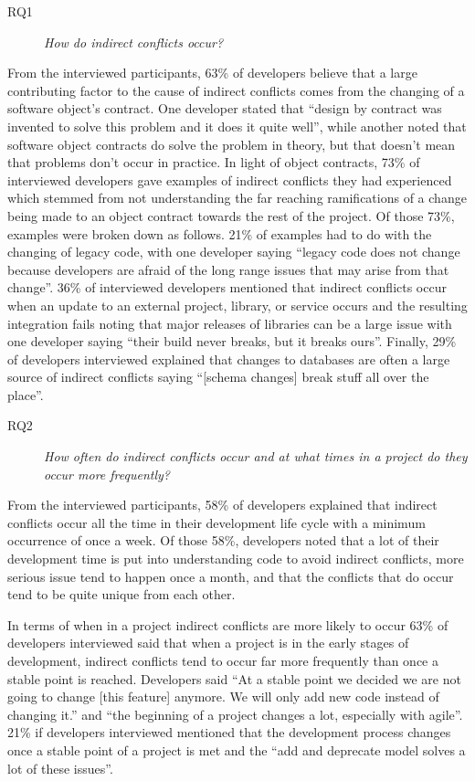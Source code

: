 \documentclass[conference]{IEEEtran}
\begin{document}
\begin{description}
	\item[RQ1] \textit{How do indirect conflicts occur?}
\end{description}

From the interviewed participants, 63\% of developers believe that a large contributing factor to the cause
of indirect conflicts comes from the changing of a software object's contract. One developer stated that ``design
by contract was invented to solve this problem and it does it quite well'', while another noted that software 
object contracts do solve the problem in theory, but that doesn't mean that problems don't occur in practice.
In light of object contracts, 73\% of interviewed developers gave examples of indirect conflicts they had experienced
which stemmed from not understanding the far reaching ramifications of a change being made to an object contract
towards the rest of the project. Of those 73\%, examples were broken down as follows. 21\% of examples had to do 
with the changing of legacy code, with one developer saying ``legacy code does not change because developers 
are afraid of the long range issues that may arise from that change''. 36\% of interviewed developers mentioned 
that indirect conflicts occur when an update to an external project, library, or service occurs and the resulting 
integration fails noting that major releases of libraries can be a large issue with one developer saying 
``their build never breaks, but it breaks ours''. Finally, 29\% of developers interviewed explained that changes to
databases are often a large source of indirect conflicts saying ``[schema changes] break stuff all over the place''.

\begin{description}
	\item[RQ2] \textit{How often do indirect conflicts occur and at what times in a project do they occur more frequently?}
\end{description}

From the interviewed participants, 58\% of developers explained that indirect conflicts occur all the time in
their development life cycle with a minimum occurrence of once a week. Of those 58\%, developers noted that a
lot of their development time is put into understanding code to avoid indirect conflicts, more serious issue tend
to happen once a month, and that the conflicts that do occur tend to be quite unique from each other.

In terms of when in a project indirect conflicts are more likely to occur 63\% of developers interviewed said that
when a project is in the early stages of development, indirect conflicts tend to occur far more frequently
than once a stable point is reached. Developers said ``At a stable point we decided we are not going to change
[this feature] anymore. We will only add new code instead of changing it.'' and ``the beginning of a project 
changes a lot, especially with agile''. 21\% if developers interviewed mentioned that the development process
changes once a stable point of a project is met and the ``add and deprecate model solves a lot of these issues''.
\end{document}
